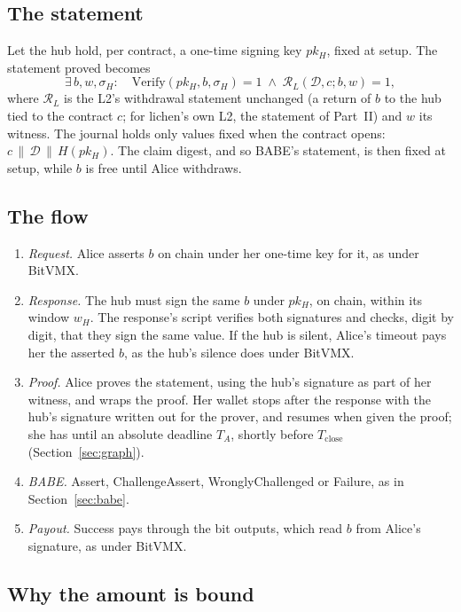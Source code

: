 \documentclass[11pt]{article}
\newcommand{\Tc}{T_{\mathrm{close}}}
\begin{document}
\subsection{The statement}

Let the hub hold, per contract, a one-time signing key $pk_H$, fixed at
setup. The statement proved becomes
\[
  \exists\, b, w, \sigma_H:\quad
  \mathrm{Verify}(pk_H, b, \sigma_H) = 1 \;\wedge\;
  \mathcal{R}_L(\mathcal{D}, c; b, w) = 1,
\]
where $\mathcal{R}_L$ is the L2's withdrawal statement unchanged (a
return of $b$ to the hub tied to the contract $c$; for lichen's own L2,
the statement of Part~II) and $w$ its witness. The journal holds only
values fixed when the contract opens: $c \,\|\, \mathcal{D} \,\|\, H(pk_H)$.
The claim digest, and so BABE's statement, is then fixed at setup, while
$b$ is free until Alice withdraws.

\subsection{The flow}

\begin{enumerate}[leftmargin=1.5em]
\item \emph{Request.} Alice asserts $b$ on chain under her one-time key
  for it, as under BitVMX.
\item \emph{Response.} The hub must sign the same $b$ under $pk_H$, on
  chain, within its window $w_H$. The response's script verifies both
  signatures and checks, digit by digit, that they sign the same value.
  If the hub is silent, Alice's timeout pays her the asserted $b$, as
  the hub's silence does under BitVMX.
\item \emph{Proof.} Alice proves the statement, using the hub's
  signature as part of her witness, and wraps the proof. Her wallet
  stops after the response with the hub's signature written out for the
  prover, and resumes when given the proof; she has until an absolute
  deadline $T_A$, shortly before $\Tc$ (Section~\ref{sec:graph}).
\item \emph{BABE.} Assert, ChallengeAssert, WronglyChallenged or
  Failure, as in Section~\ref{sec:babe}.
\item \emph{Payout.} Success pays through the bit outputs, which read
  $b$ from Alice's signature, as under BitVMX.
\end{enumerate}

\subsection{Why the amount is bound}
\label{sec:binding}
\end{document}
